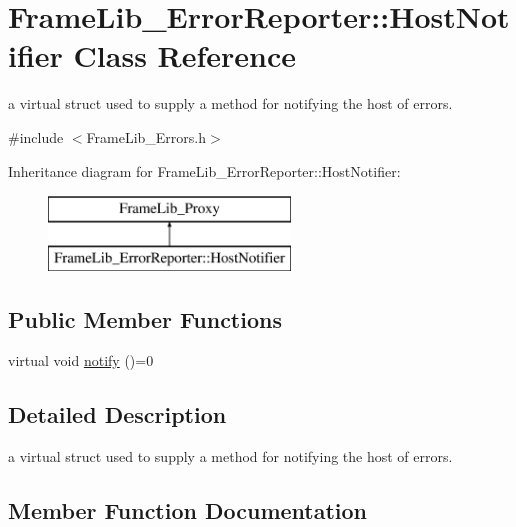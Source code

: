 \hypertarget{struct_frame_lib___error_reporter_1_1_host_notifier}{}\section{Frame\+Lib\+\_\+\+Error\+Reporter\+:\+:Host\+Notifier Class Reference}
\label{struct_frame_lib___error_reporter_1_1_host_notifier}


a virtual struct used to supply a method for notifying the host of errors.  




{\ttfamily \#include $<$Frame\+Lib\+\_\+\+Errors.\+h$>$}

Inheritance diagram for Frame\+Lib\+\_\+\+Error\+Reporter\+:\+:Host\+Notifier\+:\begin{figure}[H]
\begin{center}
\leavevmode
\includegraphics[height=2.000000cm]{struct_frame_lib___error_reporter_1_1_host_notifier}
\end{center}
\end{figure}
\subsection*{Public Member Functions}
\begin{DoxyCompactItemize}
\item 
virtual void \hyperlink{struct_frame_lib___error_reporter_1_1_host_notifier_afc33640bf01b639b23fd9f69263f0fe8}{notify} ()=0
\end{DoxyCompactItemize}


\subsection{Detailed Description}
a virtual struct used to supply a method for notifying the host of errors. 

\subsection{Member Function Documentation}
\mbox{\label{struct_frame_lib___error_reporter_1_1_host_notifier_afc33640bf01b639b23fd9f69263f0fe8}} 
